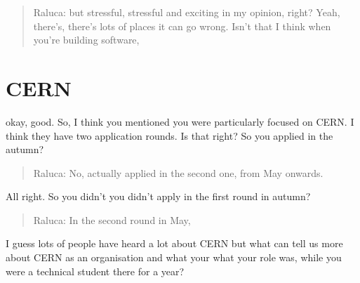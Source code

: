 \documentclass[
]{book}
\begin{document}
\begin{quote}
Raluca: but stressful, stressful and exciting in my opinion, right? Yeah, there's, there's lots of places it can go wrong. Isn't that I think when you're building software,
\end{quote}

\hypertarget{cern}{%
\section{CERN}\label{cern}}

okay, good. So, I think you mentioned you were particularly focused on CERN. I think they have two application rounds. Is that right? So you applied in the autumn?

\begin{quote}
Raluca: No, actually applied in the second one, from May onwards.
\end{quote}

All right. So you didn't you didn't apply in the first round in autumn?

\begin{quote}
Raluca: In the second round in May,
\end{quote}

I guess lots of people have heard a lot about CERN but what can tell us more about CERN as an organisation and what your what your role was, while you were a technical student there for a year?
\end{document}
